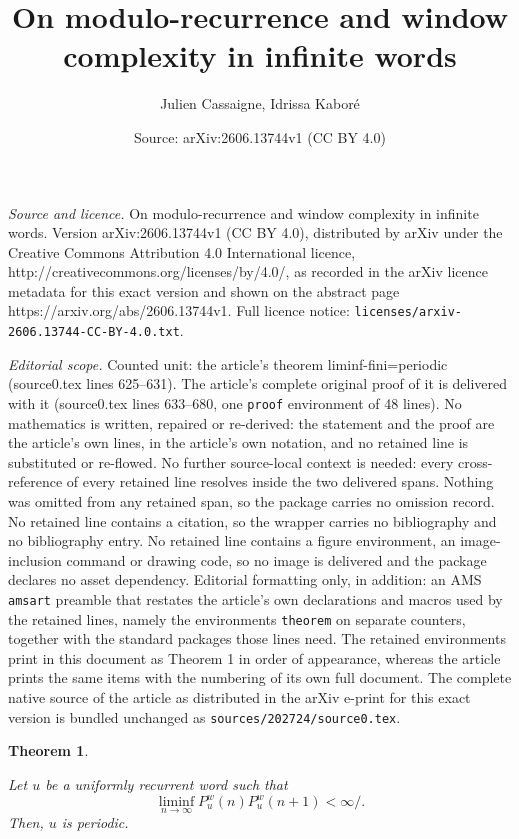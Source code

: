 \documentclass[10pt,a4paper]{amsart}
\title{On modulo-recurrence and window complexity in infinite words}
\author{Julien Cassaigne, Idrissa Kabor\'e}
\date{Source: arXiv:2606.13744v1 (CC BY 4.0)}
\newtheorem{theorem}{Theorem}
\begin{document}
\maketitle

\noindent\emph{Source and licence.} On modulo-recurrence and window complexity in infinite words. Version arXiv:2606.13744v1 (CC BY 4.0), distributed by arXiv under the Creative Commons Attribution 4.0 International licence, http://creativecommons.org/licenses/by/4.0/, as recorded in the arXiv licence metadata for this exact version and shown on the abstract page https://arxiv.org/abs/2606.13744v1. Full licence notice: \texttt{licenses/arxiv-2606.13744-CC-BY-4.0.txt}.\par\smallskip

\noindent\textit{Editorial scope.} Counted unit: the article's theorem liminf-fini=periodic (source0.tex lines 625--631). The article's complete original proof of it is delivered with it (source0.tex lines 633--680, one \texttt{proof} environment of 48 lines). No mathematics is written, repaired or re-derived: the statement and the proof are the article's own lines, in the article's own notation, and no retained line is substituted or re-flowed.  No further source-local context is needed: every cross-reference of every retained line resolves inside the two delivered spans.  Nothing was omitted from any retained span, so the package carries no omission record.  No retained line contains a citation, so the wrapper carries no bibliography and no bibliography entry.  No retained line contains a figure environment, an image-inclusion command or drawing code, so no image is delivered and the package declares no asset dependency.  Editorial formatting only, in addition: an AMS \texttt{amsart} preamble that restates the article's own declarations and macros used by the retained lines, namely the environments \texttt{theorem} on separate counters, together with the standard packages those lines need.  The retained environments print in this document as Theorem 1 in order of appearance, whereas the article prints the same items with the numbering of its own full document.  The complete native source of the article as distributed in the arXiv e-print for this exact version is bundled unchanged as \texttt{sources/202724/source0.tex}.
\begin{theorem} \label{liminf-fini=periodic}

Let $u$ be a uniformly recurrent word such that
 $$\liminf_{n\rightarrow \infty} P^{w}_{u}(n) P^{w}_{u}(n+1) <\infty/.$$
 Then,  $u$ is periodic.

\end{theorem}
\end{document}
